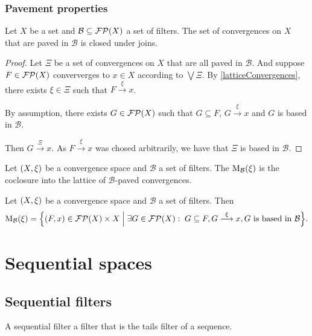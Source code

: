 \subsection{Pavement properties}
\label{pavementModificationConvergence}
\begin{lemma}
Let $X$ be a set and $\mathcal{B}\subseteq \operatorname{\mathcal{FP}}(X)$ a set of filters. The set of convergences on $X$ that are paved in $\mathcal{B}$ is closed under joins.
\end{lemma}
\begin{proof}
Let $\Xi$ be a set of convergences on $X$ that are all paved in $\mathcal{B}$. And suppose $F\in\operatorname{\mathcal{FP}}(X)$ conververges to $x\in X$ according to $\bigvee \Xi$. By \ref{latticeConvergences}, there exists $\xi\in \Xi$ such that $F\overset{\xi}{\longrightarrow} x$.

By assumption, there exists $G\in\operatorname{\mathcal{FP}}(X)$ such that $G\subseteq F$, $G\overset{\xi}{\longrightarrow} x$ and $G$ is based in $\mathcal{B}$.

Then $G\overset{\Xi}{\longrightarrow} x$. As $F\overset{\xi}{\longrightarrow} x$ was chosed arbitrarily, we have that $\Xi$ is based in $\mathcal{B}$.
\end{proof}

\begin{definition}
Let $\sSet{X, \xi}$ be a convergence space and $\mathcal{B}$ a set of filters. The  $\operatorname{M}_\mathcal{B}(\xi)$ is the coclosure into the lattice of $\mathcal{B}$-paved convergences.
\end{definition}

\begin{lemma} \label{pavedModificationConstruction}
Let $\sSet{X, \xi}$ be a convergence space and $\mathcal{B}$ a set of filters. Then
\[ \pavedMod_\mathcal{B}(\xi) = \setbuilder{(F,x)\in \powerfilters(X)\times X}{\exists G\in \powerfilters(X): \; G\subseteq F, G\overset{\xi}{\longrightarrow} x, \text{$G$ is based in $\mathcal{B}$}}. \]
\end{lemma}




\chapter{Sequential spaces}

\section{Sequential filters}
A sequential filter a filter that is the tails filter of a sequence.

